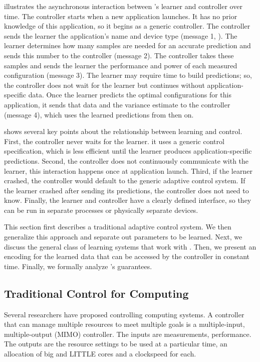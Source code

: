  illustrates the asynchronous interaction between
\SYSTEM{}'s learner and controller over time. The controller starts
when a new application launches.  It has no prior knowledge of this
application, so it begins as a generic controller.  The controller
sends the learner the application's name and device type (message 1,
).  The learner determines how many samples are
needed for an accurate prediction and sends this number to the
controller (message 2).  The controller takes these samples and sends
the learner the performance and power of each measured configuration
(message 3).  The learner may require time to build predictions; so,
the controller does not wait for the learner but continues without
application-specific data.  Once the learner predicts the optimal
configurations for this application, it sends that data and the
variance estimate to the controller (message 4), which uses the
learned predictions from then on.

 shows several key points about the relationship
between learning and control.  First, the controller never waits for
the learner. it uses a generic control specification, which is less
efficient until the learner produces application-specific predictions.
Second, the controller does not continuously communicate with the
learner, this interaction happens once at application launch.  Third,
if the learner crashed, the controller would default to the generic
adaptive control system.  If the learner crashed after sending its
predictions, the controller does not need to know.  Finally, the
learner and controller have a clearly defined interface, so they can
be run in separate processes or physically separate devices.

This section first describes a traditional adaptive control system.
We then generalize this approach and separate out parameters to be
learned.  Next, we discuss the general class of learning systems that
work with \SYSTEM{}.  Then, we present an encoding for the learned
data that can be accessed by the controller in constant time.
Finally, we formally analyze \SYSTEM{}'s guarantees.


\subsection{Traditional Control for Computing}
Several researchers have proposed controlling computing systems.  A
controller that can manage multiple resources to meet multiple goals
is a multiple-input, multiple-output (MIMO) controller.  The inputs
are measurements, \eg{} performance.  The outputs are the resource
settings to be used at a particular time, \eg{} an allocation of big
and LITTLE cores and a clockspeed for each.

